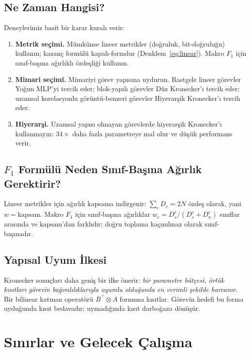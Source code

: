 \documentclass[11pt,a4paper]{article}
\begin{document}
\subsection{Ne Zaman Hangisi?}
\label{sec:decision}

Deneylerimiz basit bir karar kuralı verir:

\begin{enumerate}
\item \textbf{Metrik seçimi.} Mümkünse lineer metrikler (doğruluk,
bit-doğruluğu) kullanın; kazanç formülü kapalı-formdur
(Denklem~\ref{eq:linear}). Makro $F_1$ için sınıf-başına ağırlıklı
özdeşliği kullanın.
\item \textbf{Mimari seçimi.} Mimariyi görev yapısına uydurun. Rastgele
lineer görevler Yoğun MLP'yi tercih eder; blok-yapılı görevler Düz
Kronecker'ı tercih eder; uzamsal korelasyonlu görüntü-benzeri görevler
Hiyerarşik Kronecker'ı tercih eder.
\item \textbf{Hiyerarşi.} Uzamsal yapısı olmayan görevlerde hiyerarşik
Kronecker'ı kullanmayın: $34\times$ daha fazla parametreye mal olur ve
düşük performans verir.
\end{enumerate}

\subsection{$F_1$ Formülü Neden Sınıf-Başına Ağırlık Gerektirir?}

Lineer metrikler için ağırlık kapsama indirgenir:
$\sum_c D_c = 2N$ özdeş olarak, yani $w = \text{kapsam}$.
Makro $F_1$ için sınıf-başına ağırlıklar
$w_c = D_s^c / (D_s^c + D_n^c)$ sınıflar arasında ve
$\text{kapsam}$'dan farklıdır; doğru toplama kaçınılmaz olarak
sınıf-başınadır.

\subsection{Yapısal Uyum İlkesi}

Kronecker sonuçları daha geniş bir ilke önerir: \emph{bir parametre
bütçesi, örtük kısıtları görevin bağımlılıklarıyla uyumlu olduğunda en
verimli şekilde harcanır}. Bir bilinear katman operatörü
$B^\top \otimes A$ formuna kısıtlar. Görevin hedefi bu forma uyduğunda
kısıt bedavadır; uymadığında kısıt darboğaza dönüşür.

\section{Sınırlar ve Gelecek Çalışma}
\label{sec:limitations}
\end{document}
